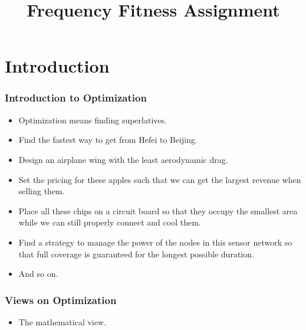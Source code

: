 \documentclass[aspectratio=169,mathserif,notheorems]{beamer}%
\title{Frequency Fitness Assignment}%
\begin{document}
%
\startPresentation%
%
\section{Introduction}%
%
\begin{frame}[t]%
\frametitle{Introduction to Optimization}%
\begin{itemize}%
\item Optimization means finding superlatives.%
\item<2-> Find the \alert{fastest} way to get from Hefei to Beijing.%
\item<3-> Design an airplane wing with the \alert{least} aerodynamic drag.%
\item<4-> Set the pricing for these apples such that we can get the \alert{largest} revenue when selling them.%
\item<5-> Place all these chips on a circuit board so that they occupy the \alert{smallest} area while we can still properly connect and cool them.%
\item<6-> Find a strategy to manage the power of the nodes in this sensor network so that full coverage is guaranteed for the \alert{longest} possible duration.%
\item<7-> And so on.%
\end{itemize}%
%
%
\end{frame}%
%
\begin{frame}[t]%
\frametitle{Views on Optimization}%
\begin{itemize}%
%
%
\item<3-> The mathematical view.%
\end{itemize}%
%
%
\end{frame}%
\end{document}
